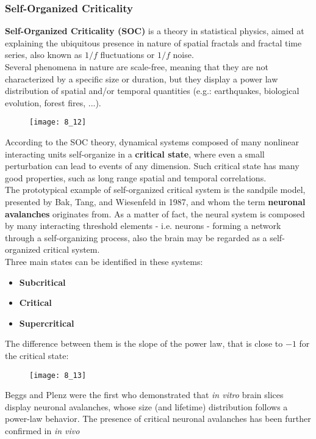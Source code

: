 \subsubsection{Self-Organized Criticality}
\textbf{Self-Organized Criticality (SOC)} is a theory in statistical physics, aimed at
explaining the ubiquitous presence in nature of spatial fractals and fractal time series,
also known as \(1/f\) fluctuations or \(1/f\) noise.\\
Several phenomena in nature are scale-free, meaning that they are not characterized by a
specific size or duration, but they display a power law distribution of spatial and/or
temporal quantities (e.g.: earthquakes, biological evolution, forest fires, ...).
\begin{figure}[H]
    \texttt{[image: 8\_12]}
    \centering
\end{figure}
According to the SOC theory, dynamical systems composed of many nonlinear interacting units
self-organize in a \textbf{critical state}, where even a small perturbation can lead to
events of any dimension. Such critical state has many good properties, such as long range
spatial and temporal correlations.\\
The prototypical example of self-organized critical system is the sandpile model, presented
by Bak, Tang, and Wiesenfeld in 1987, and whom the term \textbf{neuronal avalanches}
originates from. As a matter of fact, the neural system is composed by many interacting
threshold elements - i.e. neurons - forming a network through a self-organizing process,
also the brain may be regarded as a self-organized critical system.\\
Three main states can be identified in these systems:
\begin{itemize}
    \item \textbf{Subcritical}
    \item \textbf{Critical}
    \item \textbf{Supercritical}
\end{itemize}
The difference between them is the slope of the power law, that is close to \(-1\) for the
critical state:
\begin{figure}[H]
    \texttt{[image: 8\_13]}
    \centering
\end{figure}
Beggs and Plenz were the first who demonstrated that \textit{in vitro} brain slices display
neuronal avalanches, whose size (and lifetime) distribution follows a power-law behavior.
The presence of critical neuronal avalanches has been further confirmed in \textit{in vivo}
